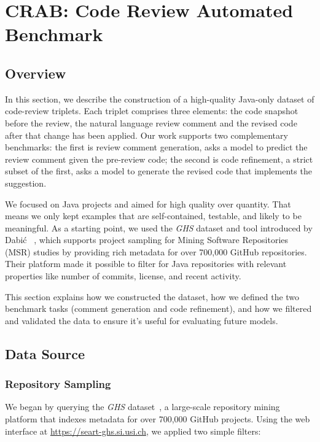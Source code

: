 \section{CRAB: Code Review Automated Benchmark}

\subsection{Overview}

In this section, we describe the construction of a high-quality Java-only dataset of code-review
triplets. Each triplet comprises three elements: the code snapshot before the review, the natural
language review comment and the revised code after that change has been applied. Our work supports
two complementary benchmarks: the first is review comment generation, asks a model to predict the
review comment given the pre-review code; the second is code refinement, a strict subset of the
first, asks a model to generate the revised code that implements the suggestion.


We focused on Java projects and aimed for high quality over quantity. That means we only kept
examples that are self-contained, testable, and likely to be meaningful. As a starting point, we
used the \textit{GHS} dataset and tool introduced by Dabić \etal~\cite{Dabic:msr2021data}, which
supports project sampling for Mining Software Repositories (MSR) studies by providing rich metadata
for over 700,000 GitHub repositories. Their platform made it possible to filter for Java
repositories with relevant properties like number of commits, license, and recent activity.

This section explains how we constructed the dataset, how we defined the two benchmark tasks
(comment generation and code refinement), and how we filtered and validated the data to ensure it’s
useful for evaluating future models.


\subsection{Data Source}

\subsubsection{Repository Sampling}

We began by querying the \textit{GHS} dataset~\cite{Dabic:msr2021data}, a large-scale repository
mining platform that indexes metadata for over 700,000 GitHub projects. Using the web interface at
\url{https://seart-ghs.si.usi.ch}, we applied two simple filters:

